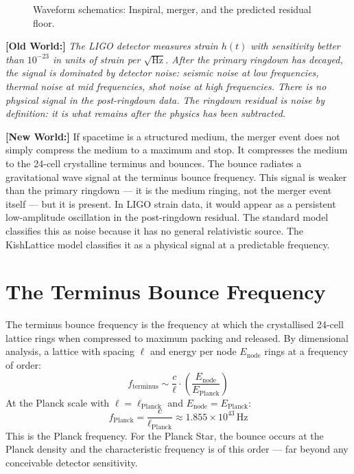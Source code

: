 \documentclass[11pt, letterpaper, openany]{book}
\newcommand{\oldworld}[1]{\noindent\textbf{\color{goldseal}[Old World:]}
  \textit{#1}\medskip}
\newcommand{\newworld}[1]{\noindent\textbf{\color{kishblue}[New World:]}
  #1\medskip}
\begin{document}
\begin{figure}[H]
\centering
{}
\caption{Waveform schematics: Inspiral, merger, and the predicted residual floor.}
\end{figure}

\oldworld{The LIGO detector measures strain $h(t)$ with sensitivity better
than $10^{-23}$ in units of strain per $\sqrt{\text{Hz}}$. After the primary
ringdown has decayed, the signal is dominated by detector noise: seismic
noise at low frequencies, thermal noise at mid frequencies, shot noise at
high frequencies. There is no physical signal in the post-ringdown data.
The ringdown residual is noise by definition: it is what remains after
the physics has been subtracted.}

\newworld{If spacetime is a structured medium, the merger event does not
simply compress the medium to a maximum and stop. It compresses the medium
to the 24-cell crystalline terminus and bounces. The bounce radiates a
gravitational wave signal at the terminus bounce frequency. This signal is
weaker than the primary ringdown --- it is the medium ringing, not the merger
event itself --- but it is present. In LIGO strain data, it would appear as
a persistent low-amplitude oscillation in the post-ringdown residual. The
standard model classifies this as noise because it has no general relativistic
source. The KishLattice model classifies it as a physical signal at a
predictable frequency.}

\section{The Terminus Bounce Frequency}

The terminus bounce frequency is the frequency at which the crystallised
24-cell lattice rings when compressed to maximum packing and released.
By dimensional analysis, a lattice with spacing $\ell$ and energy per node
$E_\text{node}$ rings at a frequency of order:
\[
f_\text{terminus} \sim \frac{c}{\ell} \cdot \left(\frac{E_\text{node}}{E_\text{Planck}}\right)
\]
At the Planck scale with $\ell = \ell_\text{Planck}$ and
$E_\text{node} = E_\text{Planck}$:
\[
f_\text{Planck} = \frac{c}{\ell_\text{Planck}} \approx 1.855 \times 10^{43}\,\text{Hz}
\]
This is the Planck frequency. For the Planck Star, the bounce occurs at the
Planck density and the characteristic frequency is of this order --- far
beyond any conceivable detector sensitivity.
\end{document}
